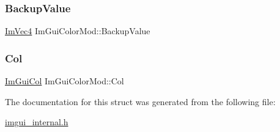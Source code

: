 \subsubsection{\texorpdfstring{Backup\+Value}{BackupValue}}
{\footnotesize\ttfamily \mbox{\hyperlink{struct_im_vec4}{Im\+Vec4}} Im\+Gui\+Color\+Mod\+::\+Backup\+Value}

\mbox{\label{struct_im_gui_color_mod_a211171bd30d39348fc9b91289d253e1c}} 
\subsubsection{\texorpdfstring{Col}{Col}}
{\footnotesize\ttfamily \mbox{\hyperlink{imgui_8h_a1b0467ec582e731ae6292fef726fb5fe}{Im\+Gui\+Col}} Im\+Gui\+Color\+Mod\+::\+Col}



The documentation for this struct was generated from the following file\+:\begin{DoxyCompactItemize}
\item 
\mbox{\hyperlink{imgui__internal_8h}{imgui\+\_\+internal.\+h}}\end{DoxyCompactItemize}
